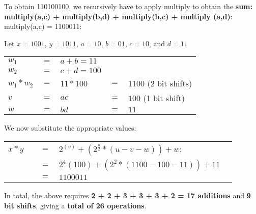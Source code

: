 \documentclass{article}
\begin{document}
To obtain 110100100, we recursively have to apply multiply to obtain the \textbf{sum: multiply(a,c) +   multiply(b,d) + multiply(b,c) + multiply (a,d)}: \\

multiply(a,c) = 1100011:
\begin{center}
	Let $x = 1001$, $y = 1011$, $a = 10$, $b = 01$, $c = 10$, and $d = 11$ \\
	\begin{tabular}{l l l l l}
		\\ $w_1$ &$=$ &$a + b = 11$ \\
		$w_2$ &$=$ &$c + d = 100$ \\
		$w_1 * w_2$ &$=$ &$11 * 100$ &$=$ &$1100$ (2 bit shifts) \\
		$v$ &$=$ &$ac$ &$=$ &$100$ (1 bit shift)\\
		$w$ &$=$ &$bd$ &$=$ &$11$ \\
	\end{tabular}
\end{center}

We now substitute the appropriate values:
\begin{center}
	\begin{tabular}{l l l l l}
		$x*y$ &&$=$ &$2^(v) + (2^{\frac{n}{2}}* (u-v-w)) + w$: \\
			   &&$=$ &$2^4(100) + (2^2 * (1100 - 100 - 11)) + 11$ \\
			   &&$=$ &$1100011$ \\
	\end{tabular}
\end{center} 
In total, the above requires \textbf{2 + 2 + 3 + 3 + 3 + 2 = 17 additions} and \textbf{9 bit shifts}, giving a \textbf{total of 26 operations}.
\end{document}
